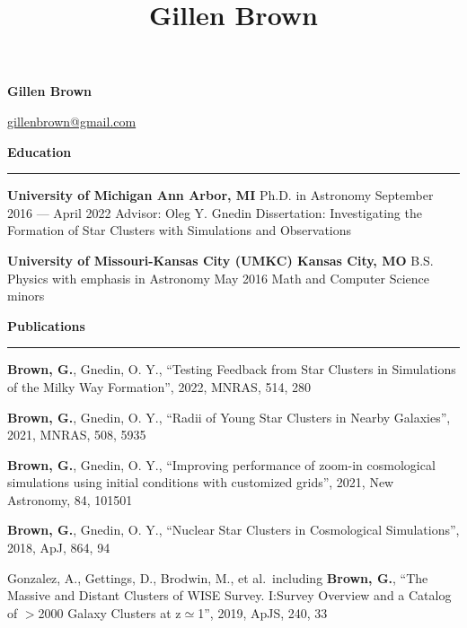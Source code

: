 \documentclass[10pt]{article}
\title{Gillen Brown}
\newcommand{\header}[1]{\vspace{2em}\par \textbf{\large #1}\strut\hrule\vspace{0em}}
\newcommand{\actionHeader}[2]{\textbf{#1 \hfill #2}}
\newcommand{\indentedItemDate}[2]{\newline\null\qquad #1 \hfill #2}
\newcommand{\indentedItem}[1]{\newline\null\qquad #1}
\begin{document}
\thispagestyle{empty}


\begin{center}
{\huge \bf Gillen Brown}

\href{mailto:gillenbrown@gmail.com}{gillenbrown@gmail.com} 
\end{center}
\bigskip



\header{Education}
\actionHeader{University of Michigan}{Ann Arbor, MI}
\indentedItemDate{Ph.D. in Astronomy}{September 2016 --- April 2022}
\indentedItem{Advisor: Oleg Y. Gnedin} 
\indentedItem{Dissertation: Investigating the Formation of Star Clusters with Simulations and Observations}

\actionHeader{University of Missouri-Kansas City (UMKC)}{Kansas City, MO}
\indentedItemDate{B.S. Physics with emphasis in Astronomy}{May 2016}
\indentedItem{Math and Computer Science minors}

\header{Publications}
\begin{etaremune}
    \item \textbf{Brown, G.}, Gnedin, O. Y., ``Testing Feedback from Star Clusters in Simulations of the Milky Way Formation'', 2022, MNRAS, 514, 280 
    \item \textbf{Brown, G.}, Gnedin, O. Y.,  ``Radii of Young Star Clusters in Nearby Galaxies'', 2021, MNRAS, 508, 5935
    \item \textbf{Brown, G.}, Gnedin, O. Y.,  ``Improving performance of zoom-in cosmological simulations using initial conditions with customized grids'', 2021, New Astronomy, 84, 101501
    \item \textbf{Brown, G.}, Gnedin, O. Y.,  ``Nuclear Star Clusters in Cosmological Simulations'', 2018, ApJ, 864, 94
    \item Gonzalez, A., Gettings, D., Brodwin, M., et al.\ including \textbf{Brown, G.}, ``The Massive and Distant Clusters of WISE Survey. I:\@ Survey Overview and a Catalog of $>$2000 Galaxy Clusters at z$\simeq$1'', 2019, ApJS, 240, 33
\end{etaremune}
\end{document}

